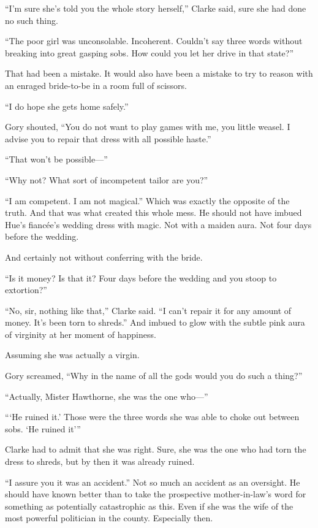 “I’m sure she’s told you the whole story herself,” Clarke said, sure she
had done no such thing.

“The poor girl was unconsolable. Incoherent. Couldn’t say three words
without breaking into great gasping sobs. How could you let her drive in
that state?”

That had been a mistake. It would also have been a mistake to try to
reason with an enraged bride-to-be in a room full of scissors.

“I do hope she gets home safely.”

Gory shouted, “You do not want to play games with me, you little weasel.
I advise you to repair that dress with all possible haste.”

“That won’t be possible—”

“Why not? What sort of incompetent tailor are you?”

“I am competent. I am not magical.” Which was exactly the opposite of
the truth. And that was what created this whole mess. He should not have
imbued Hue’s fiancée’s wedding dress with magic. Not with a maiden aura.
Not four days before the wedding.

And certainly not without conferring with the bride.

“Is it money? Is that it? Four days before the wedding and you stoop to
extortion?”

“No, sir, nothing like that,” Clarke said. “I can’t repair it for any
amount of money. It’s been torn to shreds.” And imbued to glow with the
subtle pink aura of virginity at her moment of happiness.

Assuming she was actually a virgin.

Gory screamed, “Why in the name of all the gods would you do such a
thing?”

“Actually, Mister Hawthorne, she was the one who—”

“‘He ruined it.’ Those were the three words she was able to choke out
between sobs. ‘He ruined it’”

Clarke had to admit that she was right. Sure, she was the one who had
torn the dress to shreds, but by then it was already ruined.

“I assure you it was an accident.” Not so much an accident as an
oversight. He should have known better than to take the prospective
mother-in-law’s word for something as potentially catastrophic as this.
Even if she was the wife of the most powerful politician in the county.
Especially then.

